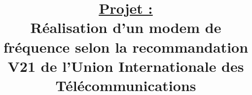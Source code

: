 \documentclass[a4paper]{article}
\title{
    \vspace{-1.5cm}
    \underline{\underline{Projet : }}\\
    Réalisation d'un modem de fréquence selon la recommandation V21 de
    l'Union Internationale des Télécommunications
    \vspace{-2.0cm}
  }
\date{}
\author{}
\begin{document}
\maketitle

\tableofcontents
\listoffigures
\lstlistoflistings
\newpage




\newpage
\end{document}
